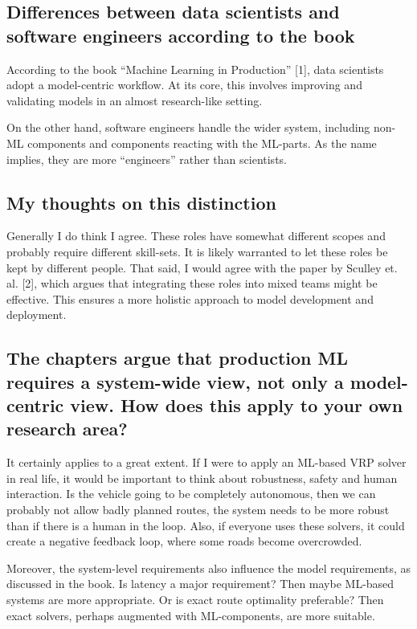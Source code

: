 \documentclass[11pt]{article}
\begin{document}
\subsection{Differences between data scientists and software engineers according to the book}

According to the book ``Machine Learning in Production'' [1], data scientists adopt a model-centric workflow. At its core, this involves improving and validating models in an almost research-like setting. 

On the other hand, software engineers handle the wider system, including non-ML components and components reacting with the ML-parts. As the name implies, they are more ``engineers'' rather than scientists. 

\subsection{My thoughts on this distinction}

Generally I do think I agree. These roles have somewhat different scopes and probably require different skill-sets. It is likely warranted to let these roles be kept by different people. That said, I would agree with the paper by Sculley et. al. [2], which argues that integrating these roles into mixed teams might be effective. This ensures a more holistic approach to model development and deployment. 

\subsection{The chapters argue that production ML requires a system-wide view, not only a model-centric view. How does this apply to your own research area?}

It certainly applies to a great extent. If I were to apply an ML-based VRP solver in real life, it would be important to think about robustness, safety and human interaction. Is the vehicle going to be completely autonomous, then we can probably not allow badly planned routes, the system needs to be more robust than if there is a human in the loop. Also, if everyone uses these solvers, it could create a negative feedback loop, where some roads become overcrowded. 

Moreover, the system-level requirements also influence the model requirements, as discussed in the book. Is latency a major requirement? Then maybe ML-based systems are more appropriate. Or is exact route optimality preferable? Then exact solvers, perhaps augmented with ML-components, are more suitable. 
\end{document}
